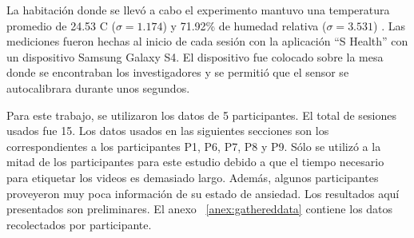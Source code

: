 La habitaci\'on donde se llev\'o a cabo el experimento mantuvo una temperatura promedio de 24.53 \textdegree  C ($\sigma= 1.174$) y 71.92\% de humedad relativa ($\sigma= 3.531$) . Las mediciones fueron hechas al inicio de cada sesi\'on con la aplicaci\'on ``S Health'' con un dispositivo Samsung Galaxy S4. El dispositivo fue colocado sobre la mesa donde se encontraban los investigadores y se permiti\'o que el sensor se autocalibrara durante unos segundos. 

Para este trabajo, se utilizaron los datos de 5 participantes. El total de sesiones usados fue 15. Los datos usados en las siguientes secciones son los correspondientes a los participantes P1, P6, P7, P8 y P9. S\'olo se utiliz\'o a la mitad de los participantes para este estudio debido a que el tiempo necesario para etiquetar los videos es demasiado largo. Adem\'as, algunos participantes proveyeron muy poca informaci\'on de su estado de ansiedad. Los resultados aqu\'i presentados son preliminares. El anexo ~\ref{anex:gathereddata} contiene los datos recolectados por participante.
